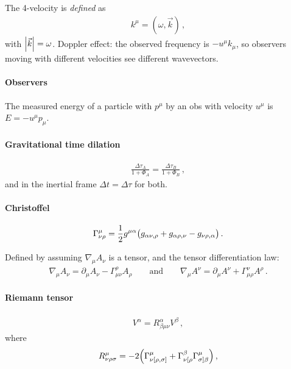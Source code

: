 \documentclass[main.tex]{subfiles}
\begin{document}
The 4-velocity is \emph{defined} as 
%
\begin{align}
k^{\mu } = (\omega , \vec{k})
\,,
\end{align}
%
with \(\abs{\vec{k}} = \omega \). 
Doppler effect: the observed frequency is \(-u^{\mu } k_{\mu }\), so observers moving with different velocities see different wavevectors.

\paragraph{Observers}

The measured energy of a particle with \(p^{\mu }\) by an obs with velocity \(u^{\mu }\) is \(E = - u^{\mu } p_{\mu }\). 

\paragraph{Gravitational time dilation}

\begin{align}
\frac{\Delta \tau _A}{ 1 + \Phi_{A}}
=\frac{\Delta \tau _B}{ 1 + \Phi_{B}}
\,,
\end{align}
%
and in the inertial frame \(\Delta t = \Delta \tau \) for both.

\paragraph{Christoffel}

\begin{align}
\Gamma^{\mu }_{\nu \rho } = \frac{1}{2} g^{\mu \alpha }
\qty(g_{\alpha \nu , \rho } + g_{\alpha \rho , \nu } - g_{\nu \rho , \alpha })
\,.
\end{align}

Defined by assuming \(\nabla_{\mu } A_{\nu }\) is a tensor, and the tensor differentiation law: 
%
\begin{align}
\nabla_{\mu } A_{\nu } = 
\partial_{\mu } A_{\nu } 
- \Gamma^{\rho }_{\mu \nu } A_{\rho }
\qquad \text{and} \qquad
\nabla_{\mu } A^{\nu } =
\partial_{\mu } A^{ \nu } 
+ \Gamma^{\nu }_{\mu \rho } A^{\rho }
\,.
\end{align}

\paragraph{Riemann tensor}


%
\begin{align}
[\nabla_{\mu }, \nabla_{\nu } ] V^{\alpha } = R_{\beta \mu \nu }^{\alpha } V^{\beta }
\,,
\end{align}
%
where 
%
\begin{align}
R_{\nu \rho \sigma }^{\mu } = -2 \qty(\Gamma^{\mu }_{\nu [\rho , \sigma ]}  + \Gamma^{\beta }_{\nu [\rho } \Gamma^{\mu }_{\sigma ] \beta })
\,,
\end{align}
\end{document}
